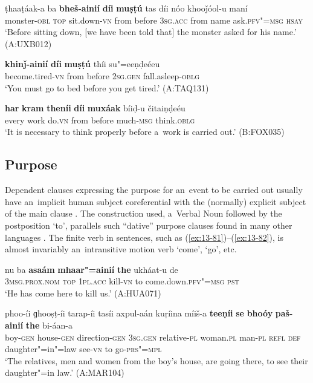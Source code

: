 \begin{exe}
\ex
\label{ex:13-78}
\gll ṭhaaṭáak-a ba \textbf{bheš-ainií} \textbf{díi} \textbf{muṣṭú} tas díi nóo khooǰóol-u maní \\
monster-\textsc{obl} \textsc{top} sit.down-\textsc{vn} from before \textsc{3sg.acc} from name ask.\textsc{pfv"=msg} \textsc{hsay} \\
\glt `Before sitting down, [we have been told that] the monster asked for his name.' (A:UXB012)

\ex
\label{ex:13-79}
\gll \textbf{khinǰ-ainií} \textbf{díi} \textbf{muṣṭú} thíi su"=eeṇḍeéeu  \\
become.tired-\textsc{vn} from before \textsc{2sg.gen} fall.asleep-\textsc{oblg} \\
\glt `You must go to bed before you get tired.' (A:TAQ131)

\ex
\label{ex:13-80}
\gll \textbf{har} \textbf{kram} \textbf{theníi} \textbf{díi} \textbf{muxáak} bíiḍ-u čitaiṇḍeéu  \\
every work do.\textsc{vn} from before much-\textsc{msg} think.\textsc{oblg} \\
\glt `It is necessary to think properly before a~work is carried out.' (B:FOX035)
\end{exe}

\subsection{Purpose}
\label{subsec:13-4-2}

Dependent clauses expressing the purpose for an~event to be carried out usually have an~implicit human subject coreferential with the (normally) explicit subject of the main clause \citep[337]{givon2001b}. The construction used, a~Verbal Noun followed by the postposition `to', parallels such ``dative'' purpose clauses found in many other languages \citep[251--252]{thompsonetal2007}. The finite verb in sentences, such as (\ref{ex:13-81})--(\ref{ex:13-82}), is almost invariably an~intransitive motion verb `come', `go', etc.

\begin{exe}
\ex
\label{ex:13-81}
\gll nu ba \textbf{asaám} \textbf{mhaar"=ainií} \textbf{the} ukháat-u de\\
\textsc{3msg.prox.nom} \textsc{top} \textsc{1pl.acc} kill-\textsc{vn} to come.down.\textsc{pfv"=msg} \textsc{pst}\\
\glt `He has come here to kill us.' (A:HUA071)

\ex
\label{ex:13-82}
\gll phoo-íi ɡhooṣṭ-íi tarap-íi tasíi axpul-aán kuṛíina míiš-a \textbf{teeṇíi} \textbf{se} \textbf{bhoóy} \textbf{paš-ainií} \textbf{the} bi-áan-a \\
boy-\textsc{gen} house-\textsc{gen} direction-\textsc{gen} \textsc{3sg.gen} relative-\textsc{pl} woman.\textsc{pl}  man-\textsc{pl} \textsc{refl} \textsc{def} daughter"=in"=law see-\textsc{vn} to go-\textsc{prs"=mpl} \\
\glt `The relatives, men and women from the boy's house, are going there, to see their daughter"=in law.' (A:MAR104) 
\end{exe}


